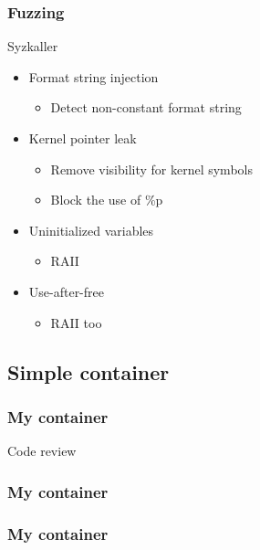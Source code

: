\documentclass{beamer}
\begin{document}
\begin{frame}
    \frametitle{Fuzzing}
    \begin{beamerboxesrounded}{Syzkaller}
        \begin{itemize}
            \item Format string injection
                  \begin{itemize}
                      \item Detect non-constant format string
                  \end{itemize}
            \item Kernel pointer leak
                  \begin{itemize}
                      \item Remove visibility for kernel symbols
                      \item Block the use of \%p
                  \end{itemize}
            \item Uninitialized variables
                  \begin{itemize}
                      \item RAII
                  \end{itemize}
            \item Use-after-free
                  \begin{itemize}
                      \item RAII too
                  \end{itemize}
        \end{itemize}
    \end{beamerboxesrounded}
\end{frame}

\subsection{Simple container}
\begin{frame}
    \frametitle{My container}
    \centering Code review
\end{frame}

\begin{frame}
    \frametitle{My container}
    
\end{frame}

\begin{frame}
    \frametitle{My container}
    
    
\end{frame}
\end{document}
